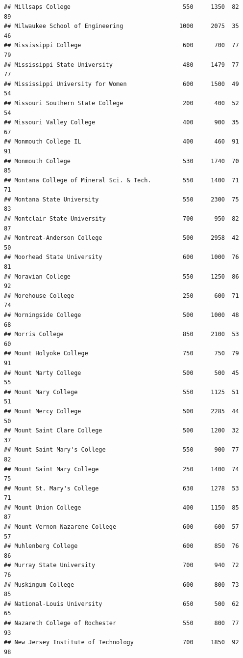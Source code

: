 \documentclass[
]{article}
\begin{document}
\begin{verbatim}
## Millsaps College                                550     1350  82       89
## Milwaukee School of Engineering                1000     2075  35       46
## Mississippi College                             600      700  77       79
## Mississippi State University                    480     1479  77       77
## Mississippi University for Women                600     1500  49       54
## Missouri Southern State College                 200      400  52       54
## Missouri Valley College                         400      900  35       67
## Monmouth College IL                             400      460  91       91
## Monmouth College                                530     1740  70       85
## Montana College of Mineral Sci. & Tech.         550     1400  71       71
## Montana State University                        550     2300  75       83
## Montclair State University                      700      950  82       87
## Montreat-Anderson College                       500     2958  42       50
## Moorhead State University                       600     1000  76       81
## Moravian College                                550     1250  86       92
## Morehouse College                               250      600  71       74
## Morningside College                             500     1000  48       68
## Morris College                                  850     2100  53       60
## Mount Holyoke College                           750      750  79       91
## Mount Marty College                             500      500  45       55
## Mount Mary College                              550     1125  51       51
## Mount Mercy College                             500     2285  44       50
## Mount Saint Clare College                       500     1200  32       37
## Mount Saint Mary's College                      550      900  77       82
## Mount Saint Mary College                        250     1400  74       75
## Mount St. Mary's College                        630     1278  53       71
## Mount Union College                             400     1150  85       87
## Mount Vernon Nazarene College                   600      600  57       57
## Muhlenberg College                              600      850  76       86
## Murray State University                         700      940  72       76
## Muskingum College                               600      800  73       85
## National-Louis University                       650      500  62       65
## Nazareth College of Rochester                   550      800  77       93
## New Jersey Institute of Technology              700     1850  92       98

\end{verbatim}
\end{document}
